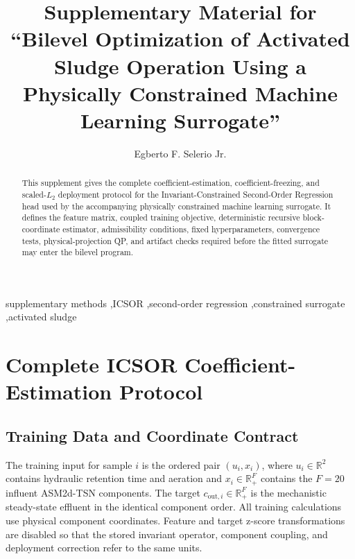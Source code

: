 \documentclass[a4paper,fleqn]{cas-sc}
\newcommand{\R}{\mathbb{R}}
\begin{document}
\let\WriteBookmarks\relax


\title[mode=title]{Supplementary Material for ``Bilevel Optimization of Activated Sludge Operation Using a Physically Constrained Machine Learning Surrogate''}

\author[1]{Egberto F. Selerio Jr.}
\cormark[1]



\begin{abstract}
This supplement gives the complete coefficient-estimation, coefficient-freezing, and scaled-$L_2$ deployment protocol for the Invariant-Constrained Second-Order Regression head used by the accompanying physically constrained machine learning surrogate. It defines the feature matrix, coupled training objective, deterministic recursive block-coordinate estimator, admissibility conditions, fixed hyperparameters, convergence tests, physical-projection QP, and artifact checks required before the fitted surrogate may enter the bilevel program.
\end{abstract}

\begin{keywords}
supplementary methods \sep ICSOR \sep second-order regression \sep constrained surrogate \sep activated sludge
\end{keywords}

\maketitle

\section{Complete ICSOR Coefficient-Estimation Protocol}

\subsection{Training Data and Coordinate Contract}

The training input for sample $i$ is the ordered pair $(u_i,x_i)$, where $u_i\in\R^2$ contains hydraulic retention time and aeration and $x_i\in\R_+^{F}$ contains the $F=20$ influent ASM2d-TSN components. The target $c_{\mathrm{out},i}\in\R_+^F$ is the mechanistic steady-state effluent in the identical component order. All training calculations use physical component coordinates. Feature and target z-score transformations are disabled so that the stored invariant operator, component coupling, and deployment correction refer to the same units.
\end{document}
